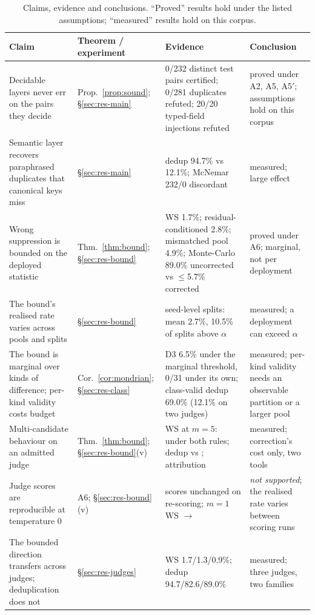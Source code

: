 \begin{table}[!tbp]
\centering\scriptsize\linespread{1.0}\selectfont\setlength{\tabcolsep}{3.5pt}
\caption{Claims, evidence and conclusions. ``Proved'' results hold under the listed assumptions; ``measured'' results hold on this corpus.}\label{tab:claims}
\begin{tabularx}{\linewidth}{@{}p{2.8cm}p{2.3cm}Xp{2.7cm}@{}}
\toprule
Claim & Theorem / experiment & Evidence & Conclusion \\
\midrule
Decidable layers never err on the pairs they decide & Prop.~\ref{prop:sound}; §\ref{sec:res-main} & 0/232 distinct test pairs certified; 0/281 duplicates refuted; 20/20 typed-field injections refuted & proved under A2, A5, A5$'$; assumptions hold on this corpus \\
Semantic layer recovers paraphrased duplicates that canonical keys miss & §\ref{sec:res-main} & dedup 94.7\% vs 12.1\%; McNemar 232/0 discordant & measured; large effect \\
Wrong suppression is bounded on the deployed statistic & Thm.~\ref{thm:bound}; §\ref{sec:res-bound} & WS 1.7\%; residual-conditioned 2.8\%; mismatched pool 4.9\%; Monte-Carlo 89.0\% uncorrected vs $\le$5.7\% corrected & proved under A6; marginal, not per deployment \\
The bound's realised rate varies across pools and splits & §\ref{sec:res-bound} & seed-level splits: mean 2.7\%, 10.5\% of splits above $\alpha$ & measured; a deployment can exceed $\alpha$ \\
The bound is marginal over kinds of difference; per-kind validity costs budget & Cor.~\ref{cor:mondrian}; §\ref{sec:res-class} & D3 6.5\% under the marginal threshold, 0/31 under its own; class-valid dedup 69.0\% (12.1\% on two judges) & measured; per-kind validity needs an observable partition or a larger pool \\
Multi-candidate behaviour on an admitted judge & Thm.~\ref{thm:bound}; §\ref{sec:res-bound}(v) & WS at $m=5$: \mclWSUncFive{} under both rules; dedup \mclDedupUncFive{} vs \mclDedupBonFive{}; attribution \mclAttrCountUncFive{} & measured; correction's cost only, two tools \\
Judge scores are reproducible at temperature 0 & A6; §\ref{sec:res-bound}(v) & \mclDriftIdenticalCount{} scores unchanged on re-scoring; $m=1$ WS \mclMOnePersisted{} $\to$ \mclMOneFresh{} & \emph{not supported}; the realised rate varies between scoring runs \\
The bounded direction transfers across judges; deduplication does not & §\ref{sec:res-judges} & WS 1.7/1.3/0.9\%; dedup 94.7/82.6/89.0\% & measured; three judges, two families \\

\end{tabularx}
\end{table}
